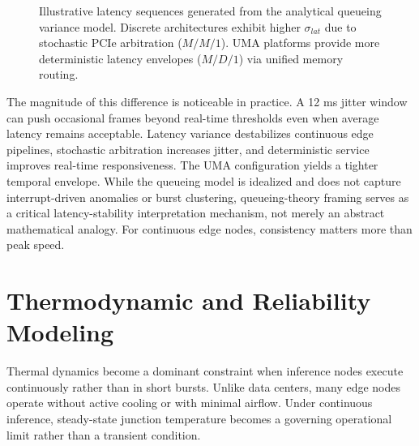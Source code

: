 \documentclass[conference]{IEEEtran}
\begin{document}
\begin{figure}[htbp]
\centering
{}
\caption{Illustrative latency sequences generated from the analytical queueing variance model. Discrete architectures exhibit higher $\sigma_{lat}$ due to stochastic PCIe arbitration ($M/M/1$). UMA platforms provide more deterministic latency envelopes ($M/D/1$) via unified memory routing.}
\label{fig:jitter}
\end{figure}

The magnitude of this difference is noticeable in practice. A 12 ms jitter window can push occasional frames beyond real-time thresholds even when average latency remains acceptable. Latency variance destabilizes continuous edge pipelines, stochastic arbitration increases jitter, and deterministic service improves real-time responsiveness. The UMA configuration yields a tighter temporal envelope. While the queueing model is idealized and does not capture interrupt-driven anomalies or burst clustering, queueing-theory framing serves as a critical latency-stability interpretation mechanism, not merely an abstract mathematical analogy. For continuous edge nodes, consistency matters more than peak speed.

\section{Thermodynamic and Reliability Modeling}

Thermal dynamics become a dominant constraint when inference nodes execute continuously rather than in short bursts. Unlike data centers, many edge nodes operate without active cooling or with minimal airflow. Under continuous inference, steady-state junction temperature becomes a governing operational limit rather than a transient condition.
\end{document}
